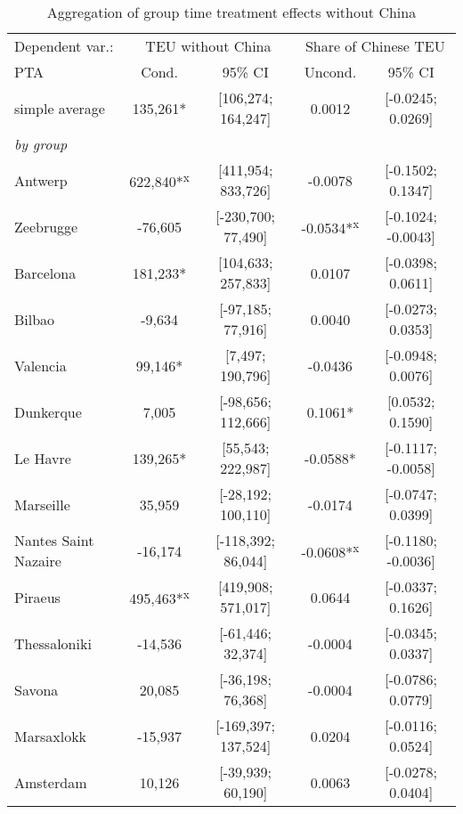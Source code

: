 \begin{table}[ht]
\centering
\caption{Aggregation of group time treatment effects without China} 
\begingroup\begin{adjustbox}{max width=\textwidth}
\begin{tabular}{lcccc}
  \hline
\hline
Dependent var.: & \multicolumn{2}{c}{TEU without China} & \multicolumn{2}{c}{Share of Chinese TEU} \\
 \cmidrule(lr){2-3} \cmidrule(lr){4-5} PTA & Cond. & 95\% CI & Uncond. & 95\% CI \\ 
  \hline
simple average & 135,261* & [106,274; 164,247] &  0.0012 & [-0.0245; 0.0269] \\ 
   [1ex]\emph{by group} &  &  &  &  \\ 
   \hline
Antwerp & 622,840*\textsuperscript{x} & [411,954; 833,726] & -0.0078 & [-0.1502; 0.1347] \\ 
  Zeebrugge & -76,605 & [-230,700; 77,490] & -0.0534*\textsuperscript{x} & [-0.1024; -0.0043] \\ 
  Barcelona & 181,233* & [104,633; 257,833] &  0.0107 & [-0.0398; 0.0611] \\ 
  Bilbao &  -9,634 & [-97,185; 77,916] &  0.0040 & [-0.0273; 0.0353] \\ 
  Valencia &  99,146* & [7,497; 190,796] & -0.0436 & [-0.0948; 0.0076] \\ 
  Dunkerque &   7,005 & [-98,656; 112,666] &  0.1061* & [0.0532; 0.1590] \\ 
  Le Havre & 139,265* & [55,543; 222,987] & -0.0588* & [-0.1117; -0.0058] \\ 
  Marseille &  35,959 & [-28,192; 100,110] & -0.0174 & [-0.0747; 0.0399] \\ 
  Nantes Saint Nazaire & -16,174 & [-118,392; 86,044] & -0.0608*\textsuperscript{x} & [-0.1180; -0.0036] \\ 
  Piraeus & 495,463*\textsuperscript{x} & [419,908; 571,017] &  0.0644 & [-0.0337; 0.1626] \\ 
  Thessaloniki & -14,536 & [-61,446; 32,374] & -0.0004 & [-0.0345; 0.0337] \\ 
  Savona &  20,085 & [-36,198; 76,368] & -0.0004 & [-0.0786; 0.0779] \\ 
  Marsaxlokk & -15,937 & [-169,397; 137,524] &  0.0204 & [-0.0116; 0.0524] \\ 
  Amsterdam &  10,126 & [-39,939; 60,190] &  0.0063 & [-0.0278; 0.0404] \\ 

\end{tabular}
\end{adjustbox}
\end{table}
